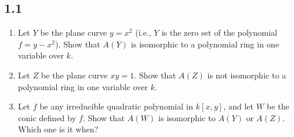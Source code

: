     \subsection*{1.1}

    \begin{enumerate}
        \item Let $Y$ be the plane curve $y = x^2$ (i.e., $Y$ is the zero set of the polynomial $f = y - x^2$). Show that $A(Y)$ is isomorphic to a polynomial ring in one variable over $k$.

        \item  Let $Z$ be the plane curve $xy = 1$. Show that $A(Z)$ is not isomorphic to a polynomial ring in one variable over $k$.

        \item Let $f$ be any irreducible quadratic polynomial in $k[x,y]$, and let $W$ be the conic defined by $f$. Show that $A(W)$ is isomorphic to $A(Y)$ or $A(Z)$. Which one is it when? \red{[Optional]}


    \end{enumerate}